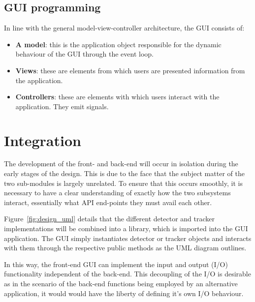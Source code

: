 

\subsection{GUI programming}
In line with the general model-view-controller architecture, the GUI consists
of:
\begin{itemize}
    \item \textbf{A model}: this is the application object responsible for the
        dynamic behaviour of the GUI through the event loop.
    \item \textbf{Views}: these are elements from which users are presented
        information from the application. 
    \item \textbf{Controllers}: these are elements with which users interact with
        the application. They emit signals.
\end{itemize}


\section{Integration}
The development of the front- and back-end will occur in isolation during the
early stages of the design. This is due to the face that the subject matter of
the two sub-modules is largely unrelated. To ensure that this occurs smoothly,
it is necessary to have a clear understanding of exactly how the two subsystems
interact, essentially what API end-points they must avail each other.

Figure~\ref{fig:design_uml} details that the different detector and tracker
implementations will be combined into a library, which is imported into the GUI
application.
The GUI simply instantiates detector or tracker objects and interacts with them
through the respective public methods as the UML diagram outlines.

In this way, the front-end GUI can implement the input and output (I/O) functionality
independent of the back-end. This decoupling of the I/O is desirable as in the
scenario of the back-end functions being employed by an alternative application,
it would would have the liberty of defining it's own I/O behaviour. 



